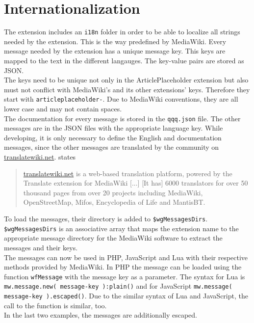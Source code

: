 \section{Internationalization}

The extension includes an \texttt{\justify i18n} folder in order to be able to localize all strings needed by the extension. This is the way predefined by MediaWiki.  Every message needed by the extension has a unique message key. This keys are mapped to the text in the different langauges. The key-value pairs are stored as JSON. \citep{wiki:34} \\
The keys need to be unique not only in the ArticlePlaceholder extension but also must not conflict with MediaWiki's and its other extensions' keys. Therefore they start with \texttt{\justify articleplaceholder-}. Due to MediaWiki conventions, they are all lower case and may not contain spaces. \\
The documentation for every message is stored in the \texttt{\justify qqq.json} file. The other messages are in the JSON files with the appropriate language key. While developing, it is only necessary to define the English and documentation messages, since the other messages are translated by the community on \url{translatewiki.net}.  \citet{wiki:26} states
\begin{quote}
 \url{translatewiki.net} is a web-based translation platform, powered by the Translate extension for MediaWiki [...] [It has] 6000 translators for over 50 thousand pages from over 20 projects including MediaWiki, OpenStreetMap, Mifos, Encyclopedia of Life and MantisBT.
\end{quote}

To load the messages, their directory is added to \texttt{\justify \$wgMessagesDirs}. \texttt{\justify \$wgMessagesDirs} is an associative array that maps the extension name to the appropriate message directory for the MediaWiki software to extract the messages and their keys. \\
The messages can now be used in PHP, JavaScript and Lua with their respective methods provided by MediaWiki. In PHP the message can be loaded using the function \texttt{\justify wfMessage} with the message key as a parameter. The syntax for Lua is \texttt{\justify mw.message.new( message-key ):plain()} and for JavaScript \texttt{\justify mw.message( message-key ).escaped()}. Due to the similar syntax of Lua and JavaScript, the call to the function is similar, too. \\ In the last two examples, the messages are additionally escaped.
